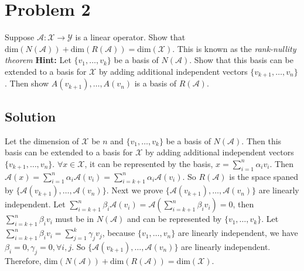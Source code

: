 \documentclass[11pt]{report}
\theoremstyle{definition}
\begin{document}
\section*{Problem 2}
Suppose $\mathcal{A} : \mathcal{X} \rightarrow \mathcal{Y}$ is a linear operator. Show that $\mbox{dim}(N(\mathcal{A})) + \mbox{dim}(R(\mathcal{A})) = \mbox{dim}(\mathcal{X})$. This is known as the {\em rank-nullity theorem}
\justify
{\bf Hint:} Let $\{v_1, \ldots , v_k\}$ be a basis of $N(\mathcal{A})$. Show that this basis can be extended to a basis for $\mathcal{X}$ by adding additional independent vectors $\{v_{k+1}, \ldots , v_n\}$. Then show $A(v_{k+1}),\ldots,A(v_n)$ is a basis of $R(\mathcal{A})$.

\subsection*{Solution}
Let the dimension of $\mathcal{X}$ be $n$ and $\{v_1, \ldots , v_k\}$ be a basis of $N(\mathcal{A})$. Then this basis can be extended to a basis for $\mathcal{X}$ by adding additional independent vectors $\{v_{k+1}, \ldots , v_n\}$. $\forall x \in \mathcal{X}$, it can be represented by the basis, $x = \sum\limits_{i=1}^{n} \alpha_i v_i$. Then $\mathcal{A}(x) = \sum\limits_{i=1}^{n} \alpha_i \mathcal{A}(v_i) = \sum\limits_{i=k+1}^{n} \alpha_i \mathcal{A}(v_i)$. So $R(\mathcal{A})$ is the space spaned by $\{\mathcal{A}(v_{k+1}), \ldots, \mathcal{A}(v_n)\}$. Next we prove $\{\mathcal{A}(v_{k+1}), \ldots, \mathcal{A}(v_n)\}$ are linearly independent. Let $\sum\limits_{i=k+1}^{n} \beta_i \mathcal{A}(v_i) = \mathcal{A}(\sum\limits_{i=k+1}^{n} \beta_i v_i) = 0$, then $\sum\limits_{i=k+1}^{n} \beta_i v_i$ must be in $N(\mathcal{A})$ and can be represented by $\{v_1, \ldots, v_k\}$. Let $\sum\limits_{i=k+1}^{n} \beta_i v_i = \sum\limits_{j=1}^{k} \gamma_j v_j$, because $\{v_1, \ldots, v_n\}$ are linearly independent, we have $\beta_i = 0, \gamma_j = 0, \forall i,j$. So $\{\mathcal{A}(v_{k+1}), \ldots, \mathcal{A}(v_n)\}$ are linearly independent. Therefore, $\mbox{dim}(N(\mathcal{A})) + \mbox{dim}(R(\mathcal{A})) = \mbox{dim}(\mathcal{X})$.

\end{document}
